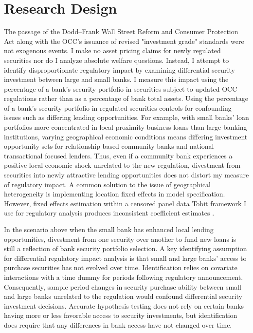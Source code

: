 \documentclass[preprint,12pt]{elsarticle}
\begin{document}
\section{Research Design}
The passage of the Dodd–Frank Wall Street Reform and Consumer Protection Act along with the OCC's issuance of revised "investment grade" standards were not exogenous events.  I make no asset pricing claims for newly regulated securities nor do I analyze absolute welfare questions.  Instead, I attempt to identify disproportionate regulatory impact by examining differential security investment between large and small banks.  I measure this impact using the percentage of a bank's security portfolio in securities subject to updated OCC regulations rather than as a percentage of bank total assets.  Using the percentage of a bank's security portfolio in regulated securities controls for confounding issues such as differing lending opportunities.  For example, with small banks' loan portfolios more concentrated in local proximity business loans than large banking institutions, varying geographical economic conditions means differing investment opportunity sets for relationship-based community banks and national transactional focused lenders. Thus, even if a community bank experiences a positive local economic shock unrelated to the new regulation, divestment from securities into newly attractive lending opportunities does not distort my measure of regulatory impact.  A common solution to the issue of geographical heterogeneity is implementing location fixed effects in model specification.  However, fixed effects estimation within a censored panel data Tobit framework I use for regulatory analysis produces inconsistent coefficient estimates \citep{Neyman1948,Lancaster2000}. 

In the scenario above when the small bank has enhanced local lending opportunities, divestment from one security over another to fund new loans is still a reflection of bank security portfolio selection.  A key identifying assumption for differential regulatory impact analysis is that small and large banks' access to purchase securities has not evolved over time.  Identification relies on covariate interactions with a time dummy for periods following regulatory announcement.  Consequently, sample period changes in security purchase ability between small and large banks unrelated to the regulation would confound differential security investment decisions.  Accurate hypothesis testing does not rely on certain banks having more or less favorable access to security investments, but identification does require that any differences in bank access have not changed over time.
\end{document}
